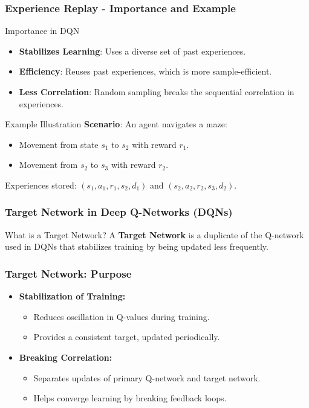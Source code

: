 \documentclass[aspectratio=169]{beamer}
\begin{document}
\begin{frame}[fragile]
    \frametitle{Experience Replay - Importance and Example}
    \begin{block}{Importance in DQN}
        \begin{itemize}
            \item \textbf{Stabilizes Learning}: Uses a diverse set of past experiences.
            \item \textbf{Efficiency}: Reuses past experiences, which is more sample-efficient.
            \item \textbf{Less Correlation}: Random sampling breaks the sequential correlation in experiences.
        \end{itemize}
    \end{block}
    
    \begin{block}{Example Illustration}
        \textbf{Scenario}: An agent navigates a maze:
        \begin{itemize}
            \item Movement from state \( s_1 \) to \( s_2 \) with reward \( r_1 \).
            \item Movement from \( s_2 \) to \( s_3 \) with reward \( r_2 \).
        \end{itemize}
        Experiences stored: \( (s_1, a_1, r_1, s_2, d_1) \) and \( (s_2, a_2, r_2, s_3, d_2) \).
    \end{block}
\end{frame}

\begin{frame}[fragile]
    \frametitle{Target Network in Deep Q-Networks (DQNs)}
    \begin{block}{What is a Target Network?}
        A \textbf{Target Network} is a duplicate of the Q-network used in DQNs that stabilizes training by being updated less frequently.
    \end{block}
\end{frame}

\begin{frame}[fragile]
    \frametitle{Target Network: Purpose}
    \begin{itemize}
        \item \textbf{Stabilization of Training:}
            \begin{itemize}
                \item Reduces oscillation in Q-values during training.
                \item Provides a consistent target, updated periodically.
            \end{itemize}
        \item \textbf{Breaking Correlation:}
            \begin{itemize}
                \item Separates updates of primary Q-network and target network.
                \item Helps converge learning by breaking feedback loops.
            \end{itemize}
    \end{itemize}
\end{frame}
\end{document}

